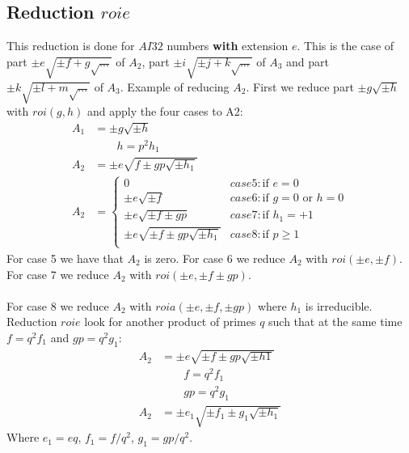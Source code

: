 \documentclass{article}
\begin{document}
\subsection{Reduction $roie$}
This reduction is done for $AI32$ numbers \textbf{with} extension $e$. This is the case of 
part $\pm e\sqrt{\pm f + g\sqrt{...}}$ of $A_2$,
part $\pm i\sqrt{\pm j + k\sqrt{...}}$ of $A_3$ and
part $\pm k\sqrt{\pm l + m\sqrt{...}}$ of $A_3$.
Example of reducing $A_2$. First we reduce part $\pm g\sqrt{\pm h}$ with $roi(g, h)$
and apply the four cases to A2:
\begin{align}
A_1 &= \pm g\sqrt{\pm h}\\
 &\qquad \boxed{ h = p^2h_1 }\\
A_2 &= \pm e\sqrt{f \pm gp\sqrt{\pm h_1}}\\
 A_2 &= \begin{cases}
 0                                       &case 5: \text{if } e = 0\\
 \pm e\sqrt{\pm f}                       &case 6: \text{if } g = 0 \text{ or } h = 0\\
 \pm e\sqrt{\pm f \pm gp}                &case 7: \text{if } h_1 = +1\\
 \pm e\sqrt{\pm f \pm gp\sqrt{\pm h_1}} &case 8: \text{if } p \geq 1\\
\end{cases}
\end{align}
For case 5 we have that $A_2$ is zero.
For case 6 we reduce $A_2$ with $roi(\pm e,\pm f)$.
For case 7 we reduce $A_2$ with $roi(\pm e,\pm f\pm gp)$.
\\
\\
For case 8 we reduce $A_2$ with $roia(\pm e,\pm f, \pm gp)$ where $h_1$ is irreducible.
Reduction $roie$ look for another product of primes $q$ such that at the same time 
$f = q^2f_1$ and $gp = q^2g_1$:
\begin{align}
A_2 &= \pm e\sqrt{\pm f \pm gp\sqrt{\pm h1}}\\
 &\qquad \boxed{ f = q^2f_1 }\\
 &\qquad \boxed{ gp = q^2g_1 }\\
A_2 &= \pm e_1\sqrt{\pm f_1 \pm g_1\sqrt{\pm h_1}}
\end{align}
Where $e_1 = eq$, $f_1 = f/{q^2}$, $g_1 = gp/{q^2}$.
\end{document}
